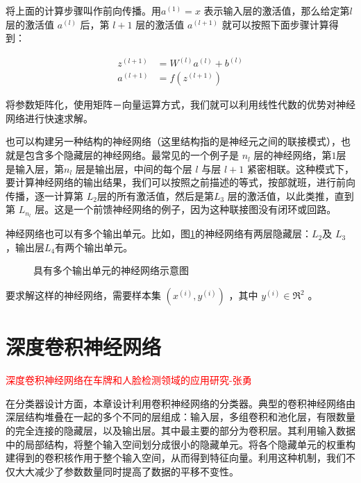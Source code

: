 将上面的计算步骤叫作前向传播。用$  a^{(1)} = x$ 表示输入层的激活值，那么给定第$  l$ 层的激活值 $ a^{(l)}$ 后，第 $ l+1$ 层的激活值 $ a^{(l+1)}$ 就可以按照下面步骤计算得到：

 \begin{align}
z^{(l+1)} &= W^{(l)} a^{(l)} + b^{(l)}   \\
a^{(l+1)} &= f(z^{(l+1)})
\end{align}

将参数矩阵化，使用矩阵－向量运算方式，我们就可以利用线性代数的优势对神经网络进行快速求解。

也可以构建另一种结构的神经网络（这里结构指的是神经元之间的联接模式），也就是包含多个隐藏层的神经网络。最常见的一个例子是 $  n_l$ 层的神经网络，第$   1 $层是输入层，第$   n_l$ 层是输出层，中间的每个层 $  l$ 与层 $  l+1$ 紧密相联。这种模式下，要计算神经网络的输出结果，我们可以按照之前描述的等式，按部就班，进行前向传播，逐一计算第 $  L_2 $层的所有激活值，然后是第$  L_3$ 层的激活值，以此类推，直到第 $  L_{n_l}$ 层。这是一个前馈神经网络的例子，因为这种联接图没有闭环或回路。

神经网络也可以有多个输出单元。比如，图\ref{fig:network2}的神经网络有两层隐藏层：$  L_2 $及 $ L_3$ ，输出层$  L_4 $有两个输出单元。

\begin{figure}
  \centering
  
  \caption{具有多个输出单元的神经网络示意图}
  \label{fig:network2}  
\end{figure}


要求解这样的神经网络，需要样本集  $ (x^{(i)}, y^{(i)})$ ，其中 $ y^{(i)} \in \Re^2$ 。
\section{深度卷积神经网络}
\textcolor{red}{深度卷积神经网络在车牌和人脸检测领域的应用研究-张勇}

在分类器设计方面，本章设计利用卷积神经网络的分类器。典型的卷积神经网络由深层结构堆叠在一起的多个不同的层组成：输入层，多组卷积和池化层，有限数量的完全连接的隐藏层，以及输出层。其中最主要的部分为卷积层。其利用输入数据中的局部结构，将整个输入空间划分成很小的隐藏单元。将各个隐藏单元的权重构建得到的卷积核作用于整个输入空间，从而得到特征向量。利用这种机制，我们不仅大大减少了参数数量同时提高了数据的平移不变性。
  
